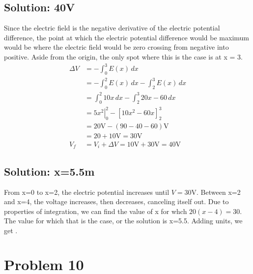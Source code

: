 \documentclass[12pt]{article}
\begin{document}
\subsection{Solution: 40V}
Since the electric field is the negative derivative of the electric potential difference, the point at which the electric potential difference would be maximum would be where the electric field would be zero crossing from negative into positive. 
Aside from the origin, the only spot where this is the case is at x = 3.
\begin{align*}
    \Delta V &= -\int_{0}^{3} E(x)\,dx\\
        &=  -\int_{0}^{2} E(x)\,dx - \int_{2}^{3} E(x)\,dx\\
        &=  \int_{0}^{2} 10x\,dx - \int_{2}^{3} 20x - 60\,dx\\
        &=  \left. 5x^2 \right|_0^2 - \left[ 10x^2 - 60x \right]_2^3\\
        &=  20 \unit{\volt} - (90 - 40 - 60) \unit{\volt}\\
        &=  20 + 10 \unit{\volt}
        =   30 \unit{\volt}\\
        V_f &=  V_i + \Delta V
        =   10 \unit{\volt} + 30 \unit{\volt}
        =   \boxed{40 \unit{\volt}}
\end{align*}

\subsection{Solution: x=5.5m}
From x=0 to x=2, the electric potential increases until $V = 30\unit\volt$. 
Between x=2 and x=4, the voltage increases, then decreases, canceling itself out. 
Due to properties of integration, we can find the value of x for whch $20(x - 4) = 30$. 
The value for which that is the case, or the solution is x=5.5.
Adding units, we get .  

\section{Problem 10}
\end{document}
